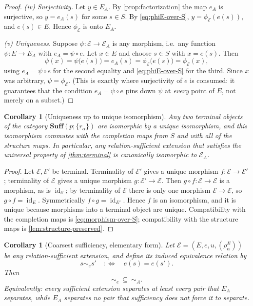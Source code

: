 \documentclass[11pt,reqno]{amsart}
\theoremstyle{plain}
\newtheorem{corollary}[theorem]{Corollary}
\theoremstyle{definition}
\theoremstyle{remark}
\numberwithin{equation}{section}
\DeclareMathOperator{\id}{id}
\begin{document}
\begin{proof}
\smallskip
\emph{(iv) Surjectivity.} Let $y\in E_A$. By \cref{prop:factorization} the map $e_A$ is surjective,
so $y=e_A(s)$ for some $s\in S$. By \eqref{eq:phiE-over-S}, $y=\phi_{\mathcal E}(e(s))$, and
$e(s)\in E$. Hence $\phi_{\mathcal E}$ is onto $E_A$.

\smallskip
\emph{(v) Uniqueness.} Suppose $\psi\colon\mathcal E\to\mathcal E_A$ is any morphism, i.e.\ any
function $\psi\colon E\to E_A$ with $e_A=\psi\circ e$. Let $x\in E$ and choose $s\in S$ with
$x=e(s)$. Then
\[
\psi(x)=\psi\bigl(e(s)\bigr)=e_A(s)=\phi_{\mathcal E}\bigl(e(s)\bigr)=\phi_{\mathcal E}(x),
\]
using $e_A=\psi\circ e$ for the second equality and \eqref{eq:phiE-over-S} for the third. Since $x$
was arbitrary, $\psi=\phi_{\mathcal E}$. (This is exactly where surjectivity of $e$ is consumed: it
guarantees that the condition $e_A=\psi\circ e$ pins down $\psi$ at \emph{every} point of $E$, not
merely on a subset.)
\end{proof}

\begin{corollary}[Uniqueness up to unique isomorphism]
\label{cor:unique}
Any two terminal objects of the category $\mathbf{Suff}(p;\{r_\alpha\})$ are isomorphic
by a unique isomorphism, and this isomorphism commutes with the completion maps from $S$
and with all of the structure maps. In particular, any relation-sufficient extension that
satisfies the universal property of \cref{thm:terminal} is canonically isomorphic to
$\mathcal E_A$.
\end{corollary}

\begin{proof}
Let $\mathcal E,\mathcal E'$ be terminal. Terminality of $\mathcal E'$ gives a unique morphism
$f\colon\mathcal E\to\mathcal E'$; terminality of $\mathcal E$ gives a unique morphism
$g\colon\mathcal E'\to\mathcal E$. Then $g\circ f\colon\mathcal E\to\mathcal E$ is a morphism, as is
$\id_{\mathcal E}$; by terminality of $\mathcal E$ there is only one morphism
$\mathcal E\to\mathcal E$, so $g\circ f=\id_E$. Symmetrically $f\circ g=\id_{E'}$. Hence $f$ is an
isomorphism, and it is unique because morphisms into a terminal object are unique. Compatibility with
the completion maps is \eqref{eq:morphism-over-S}; compatibility with the structure maps is
\cref{lem:structure-preserved}.
\end{proof}

\begin{corollary}[Coarsest sufficiency, elementary form]
\label{cor:coarsest}
Let $\mathcal E=(E,e,u,(\rho_\alpha^E))$ be any relation-sufficient extension, and define its induced
equivalence relation by
\begin{equation}
\label{eq:sim-e}
s\sim_e s'\quad:\Longleftrightarrow\quad e(s)=e(s').
\end{equation}
Then
\begin{equation}
\label{eq:coarsest}
\sim_e\ \subseteq\ \sim_A .
\end{equation}
Equivalently: every sufficient extension separates at least every pair that $E_A$ separates, while
$E_A$ separates no pair that sufficiency does not force it to separate.
\end{corollary}
\end{document}
